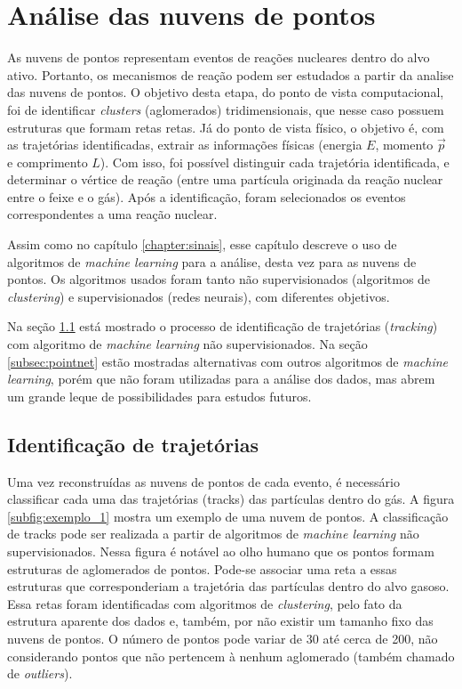 \documentclass[a4paper,12pt,oneside]{book}
\begin{document}
\chapter{Análise das nuvens de pontos}\label{chapter:point_cloud_analysis}

\par As nuvens de pontos representam eventos de reações nucleares dentro do alvo ativo. Portanto, os mecanismos de reação podem ser estudados a partir da analise das nuvens de pontos. O objetivo desta etapa, do ponto de vista computacional, foi de identificar \textit{clusters} (aglomerados) tridimensionais, que nesse caso possuem estruturas que formam retas retas. Já do ponto de vista físico, o objetivo é, com as trajetórias identificadas, extrair as informações físicas (energia $E$, momento $\vec{p}$ e comprimento $L$). Com isso, foi possível distinguir cada trajetória identificada, e determinar o vértice de reação (entre uma partícula originada da reação nuclear entre o feixe e o gás). Após a identificação, foram selecionados os eventos correspondentes a uma reação nuclear.

\par Assim como no capítulo \ref{chapter:sinais}, esse capítulo descreve o uso de algoritmos de \textit{machine learning} para a análise, desta vez para as nuvens de pontos. Os algoritmos usados foram tanto não supervisionados (algoritmos de \textit{clustering}) e supervisionados (redes neurais), com diferentes objetivos.

\par Na seção \ref{sec:forcabruta} está mostrado o processo de identificação de trajetórias (\textit{tracking}) com algoritmo de \textit{machine learning} não supervisionados. Na seção \ref{subsec:pointnet} estão mostradas alternativas com outros algoritmos de \textit{machine learning}, porém que não foram utilizadas para a análise dos dados, mas abrem um grande leque de possibilidades para estudos futuros.



\section{Identificação de trajetórias}\label{sec:forcabruta}

\par Uma vez reconstruídas as nuvens de pontos de cada evento, é necessário classificar cada uma das trajetórias (tracks) das partículas dentro do gás. A figura \ref{subfig:exemplo_1} mostra um exemplo de uma nuvem de pontos. A classificação de tracks pode ser realizada a partir de algoritmos de \textit{machine learning} não supervisionados. Nessa figura é notável ao olho humano que os pontos formam estruturas de aglomerados de pontos. Pode-se associar uma reta a essas estruturas que corresponderiam a trajetória das partículas dentro do alvo gasoso. Essa retas foram identificadas com algoritmos de \textit{clustering}, pelo fato da estrutura aparente dos dados e, também, por não existir um tamanho fixo das nuvens de pontos. O número de pontos pode variar de 30 até cerca de 200, não considerando pontos que não pertencem à nenhum aglomerado (também chamado de \textit{outliers}).
\end{document}
